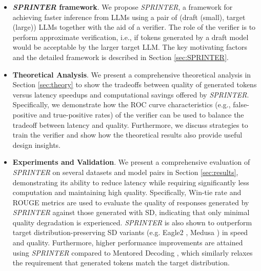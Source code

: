 \documentclass{article}
\newcommand{\revision}[1]{{\color{black} #1}}
\theoremstyle{plain}
\theoremstyle{definition}
\theoremstyle{remark}
\begin{document}
\begin{itemize}
\vspace{-5pt}
    \item \textbf{\textit{SPRINTER} framework}. We propose \textit{SPRINTER}, a framework for achieving faster inference from LLMs using a pair of (draft (small), target (large)) LLMs together with the aid of a verifier. The role of the verifier is to perform approximate verification, i.e., if tokens generated by a draft model would be acceptable by the larger target LLM. The key motivating factors and the detailed framework is described in Section \ref{sec:SPRINTER}. 
\vspace{-5pt}
    \item \textbf{Theoretical Analysis}. We present a comprehensive theoretical analysis in Section \ref{sec:theory} to show the tradeoffs between quality of generated tokens versus latency speedups and computational savings offered by \textit{SPRINTER}. Specifically, we demonstrate how the ROC curve characteristics (e.g., false-positive and true-positive rates) of the verifier can be used to balance the tradeoff between latency and quality. Furthermore, we discuss strategies to train the verifier and show how the theoretical results also provide useful design insights. 
\vspace{-1pt}
    \item \textbf{Experiments and Validation}.
    \revision{We present a comprehensive evaluation of \textit{SPRINTER} on several datasets and model pairs in Section \ref{sec:results}, demonstrating its ability to reduce latency while requiring significantly less computation and maintaining high quality. Specifically, Win-tie rate and ROUGE metrics are used to evaluate the quality of responses generated by \textit{SPRINTER} against those generated with SD, indicating that only minimal quality degradation is experienced. \textit{SPRINTER} is also shown to outperform target distribution-preserving SD variants (e.g. Eagle2 \cite{li2406eagle}, Medusa \cite{cai2024medusa}) in speed and quality. Furthermore, higher performance improvements are attained using \textit{SPRINTER} compared to Mentored Decoding \cite{tranthien2024mentored}, which similarly relaxes the requirement that generated tokens match the target distribution.}
\end{itemize}
    
\end{document}
